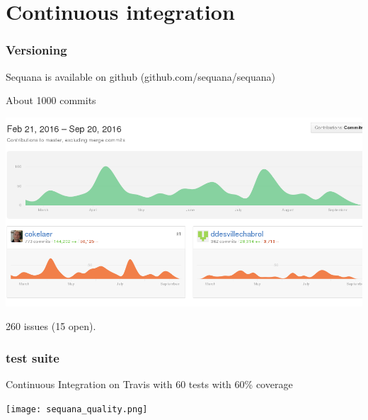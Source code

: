 \documentclass{beamer}
\begin{document}
\section{Continuous integration}

\begin{frame}[fragile]
 \frametitle{Versioning}
Sequana is available on github (github.com/sequana/sequana)

About 1000 commits \\
\begin{center}
\includegraphics[scale=0.2]{images/commits}
\end{center}
260 issues (15 open).

\end{frame}



\begin{frame}[fragile]
    \frametitle{test suite}
    \begin{block}{}
    Continuous Integration on Travis with 60 tests with 60\% coverage
    \end{block}
    
    
        \texttt{[image: sequana\_quality.png]}
\end{frame}
\end{document}
